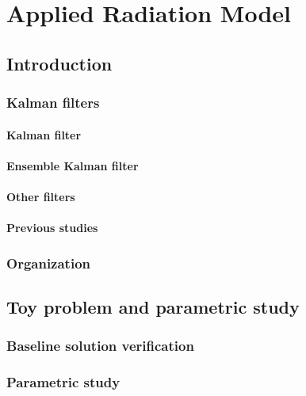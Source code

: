 \addchapheadtotoc
\chapter{Applied Radiation Model}\label{chapter:Example}

\section{Introduction}

\subsection{Kalman filters} 
\subsubsection{Kalman filter}

\subsubsection{Ensemble Kalman filter}

\subsubsection{Other filters}

\subsubsection{Previous studies}

\subsection{Organization}

\section{Toy problem and parametric study} \label{sec:toy_1DProblemDescription}


\subsection{Baseline solution verification} \label{sec:1Dtoy_verifySolnOpenFOAM}

\subsection{Parametric study}\label{sec:enkf_1dParametricStudy}

